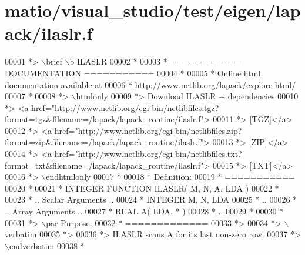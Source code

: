 \hypertarget{matio_2visual__studio_2test_2eigen_2lapack_2ilaslr_8f_source}{}\section{matio/visual\+\_\+studio/test/eigen/lapack/ilaslr.f}
\label{matio_2visual__studio_2test_2eigen_2lapack_2ilaslr_8f_source}

\begin{DoxyCode}
00001 \textcolor{comment}{*> \(\backslash\)brief \(\backslash\)b ILASLR}
00002 \textcolor{comment}{*}
00003 \textcolor{comment}{*  =========== DOCUMENTATION ===========}
00004 \textcolor{comment}{*}
00005 \textcolor{comment}{* Online html documentation available at }
00006 \textcolor{comment}{*            http://www.netlib.org/lapack/explore-html/ }
00007 \textcolor{comment}{*}
00008 \textcolor{comment}{*> \(\backslash\)htmlonly}
00009 \textcolor{comment}{*> Download ILASLR + dependencies }
00010 \textcolor{comment}{*> <a
       href="http://www.netlib.org/cgi-bin/netlibfiles.tgz?format=tgz&filename=/lapack/lapack\_routine/ilaslr.f"> }
00011 \textcolor{comment}{*> [TGZ]</a> }
00012 \textcolor{comment}{*> <a
       href="http://www.netlib.org/cgi-bin/netlibfiles.zip?format=zip&filename=/lapack/lapack\_routine/ilaslr.f"> }
00013 \textcolor{comment}{*> [ZIP]</a> }
00014 \textcolor{comment}{*> <a
       href="http://www.netlib.org/cgi-bin/netlibfiles.txt?format=txt&filename=/lapack/lapack\_routine/ilaslr.f"> }
00015 \textcolor{comment}{*> [TXT]</a>}
00016 \textcolor{comment}{*> \(\backslash\)endhtmlonly }
00017 \textcolor{comment}{*}
00018 \textcolor{comment}{*  Definition:}
00019 \textcolor{comment}{*  ===========}
00020 \textcolor{comment}{*}
00021 \textcolor{comment}{*       INTEGER FUNCTION ILASLR( M, N, A, LDA )}
00022 \textcolor{comment}{* }
00023 \textcolor{comment}{*       .. Scalar Arguments ..}
00024 \textcolor{comment}{*       INTEGER            M, N, LDA}
00025 \textcolor{comment}{*       ..}
00026 \textcolor{comment}{*       .. Array Arguments ..}
00027 \textcolor{comment}{*       REAL               A( LDA, * )}
00028 \textcolor{comment}{*       ..}
00029 \textcolor{comment}{*  }
00030 \textcolor{comment}{*}
00031 \textcolor{comment}{*> \(\backslash\)par Purpose:}
00032 \textcolor{comment}{*  =============}
00033 \textcolor{comment}{*>}
00034 \textcolor{comment}{*> \(\backslash\)verbatim}
00035 \textcolor{comment}{*>}
00036 \textcolor{comment}{*> ILASLR scans A for its last non-zero row.}
00037 \textcolor{comment}{*> \(\backslash\)endverbatim}
00038 \textcolor{comment}{*}

\end{DoxyCode}
